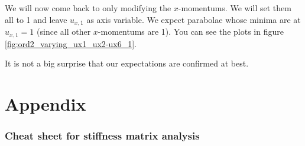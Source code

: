 \documentclass{article}
\begin{document}
We will now come back to only modifying the $x$-momentums. We will set them all to 1 and leave $u_{x,1}$ as axis variable. We expect parabolae whose minima are at $u_{x,1}=1$ (since all other $x$-momentums are 1). You can see the plots in figure \ref{fig:ord2_varying_ux1_ux2-ux6_1}.



It is not a big surprise that our expectations are confirmed at best.

\cleardoublepage{}



\appendix

\clearpage{}
\part{Appendix}
\label{part:cheat-sheet}

\section{Cheat sheet for stiffness matrix analysis}

\newenvironment{meine}{}{}
\newcommand{\mypmatrix}[1]
{
  \begin{meine}
    \renewcommand{\arraystretch}{1}
    \begin{pmatrix}
      #1
    \end{pmatrix}
    \renewcommand{\arraystretch}{2}
  \end{meine}
}
\end{document}
